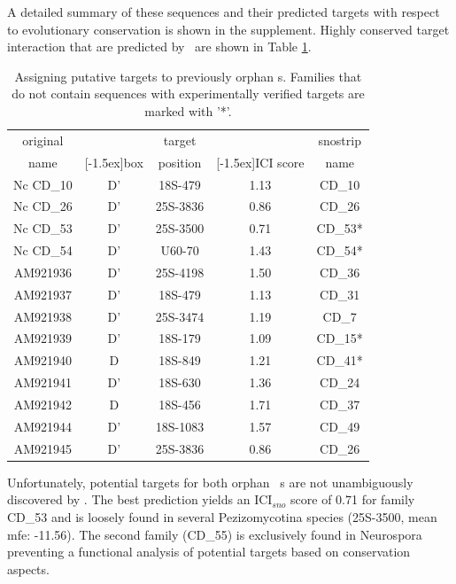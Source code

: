 A detailed summary of these sequences and their predicted targets with
respect to evolutionary conservation is shown in the supplement. Highly conserved
target interaction that are predicted by \snostrip\ are shown in Table \ref{tab:orphan_cd_snoRNAs_short}. 

\begin{table}
  \caption{Assigning putative targets to previously
    orphan \cd s. Families that do not contain sequences with
    experimentally verified targets are marked with '*'. }
  \label{tab:orphan_cd_snoRNAs_short}
  \begin{center}
    \begin{footnotesize}
      \begin{tabular}{c|c|c|c|c}
      original&&target&&snostrip\\
      name&\raisebox{1.5ex}[-1.5ex]{box}&position&\raisebox{1.5ex}[-1.5ex]{ICI
      score}&name\\
  \hline
  Nc CD\_10&D'&18S-479&1.13&CD\_10\\
\hline
  Nc CD\_26&D'&25S-3836&0.86&CD\_26\\
\hline
  Nc CD\_53&D'&25S-3500&0.71&CD\_53*\\
\hline
  Nc CD\_54&D'&U60-70&1.43&CD\_54*\\
 \hline
  AM921936&D'&25S-4198&1.50&CD\_36\\
\hline
  AM921937&D'&18S-479&1.13&CD\_31\\
\hline
  AM921938&D'&25S-3474&1.19&CD\_7\\
\hline
  AM921939&D'&18S-179&1.09&CD\_15*\\
\hline
  AM921940&D&18S-849&1.21&CD\_41*\\
\hline
  AM921941&D'&18S-630&1.36&CD\_24\\
\hline
  AM921942&D&18S-456&1.71&CD\_37\\
\hline
  AM921944&D'&18S-1083&1.57&CD\_49\\
\hline
  AM921945&D'&25S-3836&0.86&CD\_26\\

    \end{tabular}
    \end{footnotesize}
  \end{center} 
\end{table}

Unfortunately, potential targets for both orphan \ncr\ \sno s are not
unambiguously discovered by \snostrip. The best prediction yields an
ICI$_{sno}$ score of 0.71 for family CD\_53 and is loosely found in
several Pezizomycotina species (25S-3500, mean mfe: -11.56). The
second family (CD\_55) is exclusively found in Neurospora preventing a
functional analysis of potential targets based on conservation aspects. 

